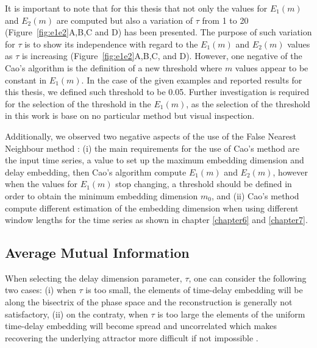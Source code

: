 It is important to note that for this thesis that not only the values for $E_1(m)$ and $E_2(m)$
are computed but also a variation of $\tau$ from 1 to 20 (Figure~\ref{fig:e1e2}A,B,C and D) has been presented.
The purpose of such variation for $\tau$ is to show its independence with
regard to the $E_1(m)$ and $E_2(m)$ values as $\tau$ is increasing (Figure~\ref{fig:e1e2}A,B,C, and D).
However, one negative of the Cao's algorithm \cite{Cao1997} is the definition of 
a new threshold where $m$ values appear to be constant in $E_1 (m)$.
In the case of the given examples and reported results for this thesis, we defined such 
threshold to be 0.05. Further investigation is required for the selection of the threshold 
in the $E_1(m)$, as the selection of the threshold in this work is base on 
no particular method but visual inspection.

Additionally, we observed two negative aspects of the use of the False Nearest 
Neighbour method \cite{Cao1997}: 
(i) the main requirements for the use of Cao's method are the input time series,
a value to set up the maximum embedding dimension and delay embedding, then 
Cao's algorithm compute $E_1(m)$ and $E_2(m)$, however
when the values for $E_1(m)$ stop changing, a threshold should be 
defined in order to obtain the minimum embedding dimension $m_0$, and
(ii) Cao's method compute different estimation of the embedding dimension
when using different window lengths for the time series as shown in chapter 
\ref{chapter6} and \ref{chapter7}.



\subsection{Average Mutual Information}
When selecting the delay dimension parameter, $\tau$, 
one can consider the following two cases:
(i) when $\tau$ is too small, the elements of time-delay embedding will be along
the bisectrix of the phase space and the reconstruction is generally not satisfactory, 
(ii) on the contraty, when $\tau$ is too large the elements of the uniform time-delay embedding will
become spread and uncorrelated which makes recovering the underlying
attractor more difficult if not impossible \cite{casdagli1991, emrani2014a, garcia2005e71}.

